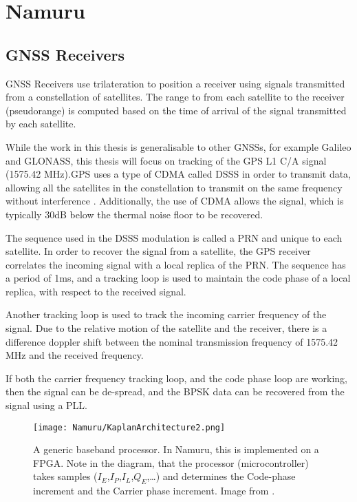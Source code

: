 \chapter{Namuru}\label{ch:Namuru}

\section{\ac{GNSS} Receivers}

\ac{GNSS} Receivers use trilateration to position a receiver using signals transmitted from a constellation of satellites. The range to from each satellite to the receiver (pseudorange) is computed based on the time of arrival of the signal transmitted by each satellite. 

While the work in this thesis is generalisable to other \ac{GNSS}s, for example Galileo and GLONASS, this thesis will focus on tracking of the GPS L1 \ac{C/A} signal (1575.42 MHz).\ac{GPS} uses a type of \ac{CDMA} called \ac{DSSS} in order to transmit data, allowing all the satellites in the constellation to transmit on the same frequency without interference \cite{Ublox}. Additionally, the use of \ac{CDMA} allows the signal, which is typically 30dB below the thermal noise floor to be recovered\cite{Gleason,Tsui}.

The sequence used in the \ac{DSSS} modulation is called a \ac{PRN} and unique to each satellite. In order to recover the signal from a satellite, the GPS receiver correlates the incoming signal with a local replica of the \ac{PRN}. The sequence has a period of 1ms, and a tracking loop is used to maintain the code phase of a local replica, with respect to the received signal. 

Another tracking loop is used to track the incoming carrier frequency of the signal. Due to the relative motion of the satellite and the receiver, there is a difference doppler shift between the nominal transmission frequency of 1575.42 MHz and the received frequency. 

If both the carrier frequency tracking loop, and the code phase loop are working, then the signal can be de-spread, and the \ac{BPSK} data can be recovered from the signal using a \ac{PLL}.


\begin{figure}[!htb] 
    \centering
    \texttt{[image: Namuru/KaplanArchitecture2.png]} 
    \caption{A generic baseband processor. In Namuru, this is implemented on a \ac{FPGA}. Note in the diagram, that the processor (microcontroller) takes samples ($I_E$,$I_P$,$I_L$,$Q_E$,\ldots) and determines the Code-phase increment and the Carrier phase increment. Image from \cite{Kaplan}.}
    \label{fig:KaplanArchitecture}
\end{figure}

